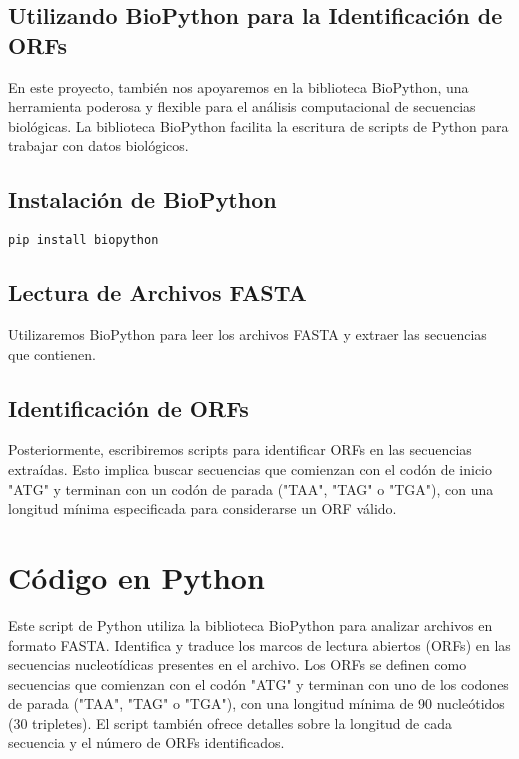 \subsection*{Utilizando BioPython para la Identificación de ORFs}

En este proyecto, también nos apoyaremos en la biblioteca BioPython, una herramienta poderosa y flexible para el análisis computacional de secuencias biológicas. La biblioteca BioPython facilita la escritura de scripts de Python para trabajar con datos biológicos.

\subsection*{Instalación de BioPython}

\begin{verbatim}
pip install biopython
\end{verbatim}

\subsection*{Lectura de Archivos FASTA}

Utilizaremos BioPython para leer los archivos FASTA y extraer las secuencias que contienen.

\subsection*{Identificación de ORFs}

Posteriormente, escribiremos scripts para identificar ORFs en las secuencias extraídas. Esto implica buscar secuencias que comienzan con el codón de inicio "ATG" y terminan con un codón de parada ("TAA", "TAG" o "TGA"), con una longitud mínima especificada para considerarse un ORF válido.


\section*{Código en Python}

Este script de Python utiliza la biblioteca BioPython para analizar archivos en formato FASTA. Identifica y traduce los marcos de lectura abiertos (ORFs) en las secuencias nucleotídicas presentes en el archivo. Los ORFs se definen como secuencias que comienzan con el codón "ATG" y terminan con uno de los codones de parada ("TAA", "TAG" o "TGA"), con una longitud mínima de 90 nucleótidos (30 tripletes). El script también ofrece detalles sobre la longitud de cada secuencia y el número de ORFs identificados.

